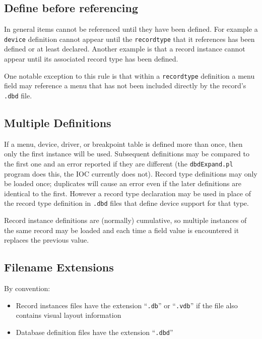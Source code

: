 \subsection{Define before referencing}

In general items cannot be referenced until they have been defined.
For example a \verb|device| definition cannot appear until the \verb|recordtype| that it references has been defined or at least declared.
Another example is that a record instance cannot appear until its associated record type has been defined.

One notable exception to this rule is that within a \verb|recordtype| definition a menu field may reference a menu that has not been included directly by the record's \verb|.dbd| file.

\subsection{Multiple Definitions}

If a menu, device, driver, or breakpoint table is defined more than once, then only the first instance will be used.
Subsequent definitions may be compared to the first one and an error reported if they are different (the \verb|dbdExpand.pl| program does this, the IOC currently does not).
Record type definitions may only be loaded once; duplicates will cause an error even if the later definitions are identical to the first.
However a record type declaration may be used in place of the record type definition in \verb|.dbd| files that define device support for that type.

Record instance definitions are (normally) cumulative, so multiple instances of the same record may be loaded and each time a field value is encountered it replaces the previous value.

\subsection{Filename Extensions}

By convention:

\begin{itemize}
\item Record instances files have the extension ``\verb|.db|'' or ``\verb|.vdb|'' if the file also contains visual layout information

\item Database definition files have the extension ``\verb|.dbd|''

\end{itemize}

